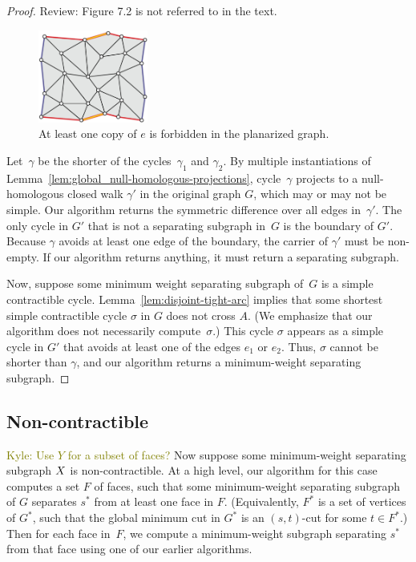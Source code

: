 \documentclass[letterpaper,review]{siamart190516}
\def\subsnip{\mathbin{\raisebox{0.15ex}{\rotatebox[origin=c]{60}{\footnotesize\Rightscissors}\!}}}
\def\Gsnip{\mathord{G_{\subsnip}}}
\def\Gsnip{G'}
\def\rnote#1{\color{red}Review: #1 \color{black}}
\def\knote#1{\textcolor{olive}{Kyle: #1}}
\begin{document}
{\begin{proof}
\rnote{Figure 7.2 is not referred to in the text. }
\begin{figure}[ht]
\centering
\includegraphics[height=1.2in]{Fig/forbidden-pair}
\caption{At least one copy of $e$ is forbidden in the planarized graph.}
\label{fig:global_forbidden-pair}
\end{figure}

Let~$\gamma$ be the shorter of the cycles~$\gamma_1$ and $\gamma_2$.  By multiple instantiations of Lemma~\ref{lem:global_null-homologous-projections}, cycle~$\gamma$ projects to a null-homologous closed walk $\gamma'$ in the original graph $G$, which may or may not be simple.
Our algorithm returns the symmetric difference over all edges in~$\gamma'$.
The only cycle in $\Gsnip$ that is not a separating subgraph in~$G$ is the boundary of $\Gsnip$.
Because $\gamma$ avoids at least one edge of the boundary, the carrier of $\gamma'$ must be non-empty. If our algorithm returns anything, it must return a separating subgraph.

Now, suppose some minimum weight separating subgraph of~$G$ is a simple contractible cycle.
Lemma~\ref{lem:disjoint-tight-arc} implies that some shortest simple contractible cycle $\sigma$ in
$G$ does not cross $A$.  (We emphasize that our algorithm does not necessarily compute~$\sigma$.)  This cycle $\sigma$ appears as a simple cycle in $\Gsnip$ that avoids at least one of the edges $e_1$ or $e_2$.  Thus, $\sigma$ cannot be shorter than $\gamma$, and our algorithm returns a minimum-weight separating subgraph.
\end{proof}


\subsection{Non-contractible}
\label{sec:global_non-contractible}

\knote{Use \(Y\) for a subset of faces?}
Now suppose some minimum-weight separating subgraph $X$ is non-contractible.  At a high level,
our algorithm for this case computes a set $F$ of faces, such that some minimum-weight separating
subgraph of $G$ separates $s^*$ from at least one face in $F$.  (Equivalently, $F^*$ is a set of
vertices of $G^*$, such that the global minimum cut in $G^*$ is an $(s,t)$-cut for some $t\in
F^*$.)  Then for each face in~$F$, we compute a minimum-weight subgraph separating $s^*$ from that
face using one of our earlier algorithms.

}
\end{document}
